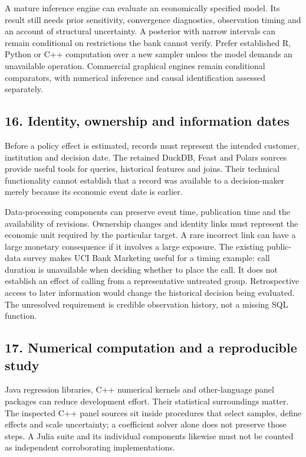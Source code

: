 A mature inference engine can evaluate an economically specified model.
Its result still needs prior sensitivity, convergence diagnostics, observation
timing and an account of structural uncertainty. A posterior with narrow intervals can remain
conditional on restrictions the bank cannot verify. Prefer established R,
Python or C++ computation over a new sampler unless the model demands an
unavailable operation. Commercial graphical engines remain conditional
comparators, with numerical inference and causal identification assessed
separately.

\subsection{16. Identity, ownership and information dates}
Before a policy effect is estimated, records must represent the intended
customer, institution and decision date. The retained DuckDB, Feast and Polars
sources provide useful tools for queries, historical features and joins.
Their technical functionality cannot establish that a record was available
to a decision-maker merely because its economic event date is earlier.
\citep{exec19_duckdb_source,exec19_feast_source,exec23_polars_sources}

Data-processing components can preserve event time, publication time and
the availability of revisions. Ownership changes and identity links must
represent the economic unit required by the particular target. A rare incorrect link can have
a large monetary consequence if it involves a large exposure. The existing
public-data survey makes UCI Bank Marketing useful for a timing example:
call duration is unavailable when deciding whether to place the call. It does
not establish an effect of calling from a representative untreated group.
\citep{pd15_uci_bank}
Retrospective access to later information would change the historical
decision being evaluated. The unresolved requirement is credible observation history, not a
missing SQL function.

\subsection{17. Numerical computation and a reproducible study}
Java regression libraries, C++ numerical kernels and other-language panel
packages can reduce development effort. Their statistical surroundings matter.
The inspected C++ panel sources sit inside procedures that select samples,
define effects and scale uncertainty; a coefficient solver alone does not
preserve those steps. A Julia suite and its individual components likewise
must not be counted as independent corroborating implementations.
\citep{exec25_paneljava_commons,exec25_panelcxx_fixest,
exec25_panelcxx_xhdfe,exec25_panelother_julia}

